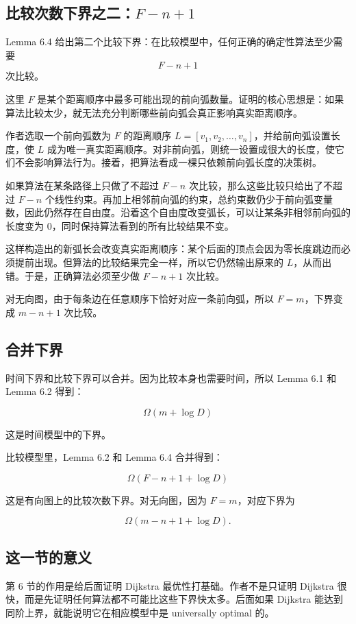 \documentclass[UTF8]{ctexart}
\begin{document}
\subsection*{比较次数下界之二：\(F-n+1\)}

Lemma 6.4 给出第二个比较下界：在比较模型中，任何正确的确定性算法至少需要
\[
F-n+1
\]
次比较。

这里 \(F\) 是某个距离顺序中最多可能出现的前向弧数量。证明的核心思想是：如果算法比较太少，就无法充分判断哪些前向弧会真正影响真实距离顺序。

作者选取一个前向弧数为 \(F\) 的距离顺序 \(L=[v_1,v_2,\ldots,v_n]\)，并给前向弧设置长度，使 \(L\) 成为唯一真实距离顺序。对非前向弧，则统一设置成很大的长度，使它们不会影响算法行为。接着，把算法看成一棵只依赖前向弧长度的决策树。

如果算法在某条路径上只做了不超过 \(F-n\) 次比较，那么这些比较只给出了不超过 \(F-n\) 个线性约束。再加上相邻前向弧的约束，总约束数仍少于前向弧变量数，因此仍然存在自由度。沿着这个自由度改变弧长，可以让某条非相邻前向弧的长度变为 0，同时保持算法看到的所有比较结果不变。

这样构造出的新弧长会改变真实距离顺序：某个后面的顶点会因为零长度跳边而必须提前出现。但算法的比较结果完全一样，所以它仍然输出原来的 \(L\)，从而出错。于是，正确算法必须至少做 \(F-n+1\) 次比较。

对无向图，由于每条边在任意顺序下恰好对应一条前向弧，所以 \(F=m\)，下界变成 \(m-n+1\) 次比较。

\subsection*{合并下界}

时间下界和比较下界可以合并。因为比较本身也需要时间，所以 Lemma 6.1 和 Lemma 6.2 得到：

\[
\Omega(m+\log D)
\]

这是时间模型中的下界。

比较模型里，Lemma 6.2 和 Lemma 6.4 合并得到：

\[
\Omega(F-n+1+\log D)
\]

这是有向图上的比较次数下界。对无向图，因为 \(F=m\)，对应下界为

\[
\Omega(m-n+1+\log D).
\]

\subsection*{这一节的意义}

第 6 节的作用是给后面证明 Dijkstra 最优性打基础。作者不是只证明 Dijkstra 很快，而是先证明任何算法都不可能比这些下界快太多。后面如果 Dijkstra 能达到同阶上界，就能说明它在相应模型中是 universally optimal 的。
\end{document}
